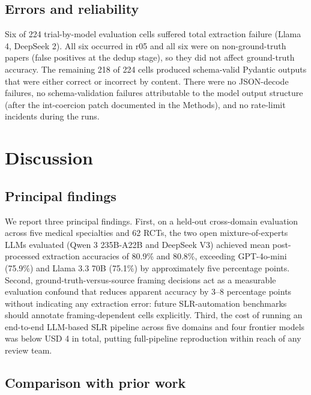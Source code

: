 \documentclass[a4paper,fleqn]{cas-sc}
\begin{document}
\subsection{Errors and reliability}

Six of 224 trial-by-model evaluation cells suffered total extraction
failure (Llama 4, DeepSeek 2). All six occurred in r05 and all six were
on non-ground-truth papers (false positives at the dedup stage),
so they did not affect ground-truth accuracy.
The remaining 218 of 224 cells produced
schema-valid Pydantic outputs that were either correct or incorrect by
content. There were no JSON-decode failures, no schema-validation
failures attributable to the model output structure (after the
int-coercion patch documented in the Methods), and no rate-limit
incidents during the runs.

\section{Discussion}\label{sec:discussion}

\subsection{Principal findings}

We report three principal findings. First, on a held-out cross-domain
evaluation across five medical specialties and 62 RCTs, the two open
mixture-of-experts LLMs evaluated (Qwen 3 235B-A22B and DeepSeek V3)
achieved mean post-processed extraction accuracies of 80.9\% and 80.8\%,
exceeding GPT-4o-mini (75.9\%) and Llama 3.3 70B (75.1\%) by
approximately five percentage points. Second, ground-truth-versus-source
framing decisions act as a measurable evaluation confound that reduces
apparent accuracy by 3--8 percentage points without indicating any
extraction error: future SLR-automation benchmarks should annotate
framing-dependent cells explicitly. Third, the cost of running an
end-to-end LLM-based SLR pipeline across five domains and four frontier
models was below USD 4 in total, putting full-pipeline reproduction
within reach of any review team.

\subsection{Comparison with prior work}
\end{document}
